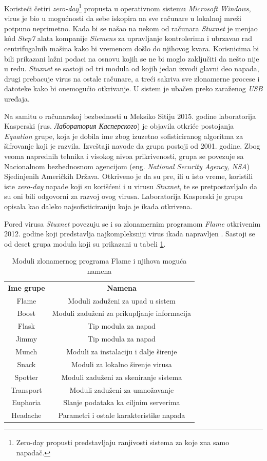 \documentclass[a4paper]{article}
\begin{document}
Koristeći četiri \textit{zero-day}\footnote{Zero-day propusti predstavljaju ranjivosti sistema za koje zna samo napadač.} propusta u operativnom sistemu \textit{Microsoft Windows}, virus je bio u mogućnosti da sebe iskopira na sve računare u lokalnoj mreži potpuno neprimetno. Kada bi se našao na nekom od računara \textit{Stuxnet} je menjao kôd \textit{Step7} alata kompanije \textit{Siemens} za upravljanje kontrolerima i ubrzavao rad centrifugalnih mašina kako bi vremenom došlo do njihovog kvara. Korisnicima bi bili prikazani lažni podaci na osnovu kojih se ne bi moglo zaključiti da nešto nije u redu. \textit{Stuxnet} se sastoji od tri modula od kojih jedan izvodi glavni deo napada, drugi prebacuje virus na ostale računare, a treći sakriva sve zlonamerne procese i datoteke kako bi onemogućio otkrivanje. U sistem je ubačen preko zaraženog \textit{USB} uređaja.

Na samitu o računarskoj bezbednosti u Meksiko Sitiju 2015. godine laboratorija Kasperski (rus. \textit{Лаборатория Касперского}) je objavila otkriće postojanja \textit{Equation} grupe, koja je dobila ime zbog izuzetno sofisticiranog algoritma za šifrovanje koji je razvila. Izveštaji navode da grupa postoji od 2001. godine. Zbog veoma naprednih tehnika i visokog nivoa prikrivenosti, grupa se povezuje sa Nacionalnom bezbednosnom agencijom (eng. \textit{National Security Agency, NSA}) Sjedinjenih Američkih Država. Otkriveno je da su pre, ili u isto vreme, koristili iste \textit{zero-day} napade koji su korišćeni i u virusu \textit{Stuxnet}, te se pretpostavljalo da su oni bili odgovorni za razvoj ovog virusa. Laboratorija Kasperski je grupu opisala kao daleko najsofisticiraniju koja je ikada otkrivena.

Pored virusa \textit{Stuxnet} povezuju se i sa zlonamernim programom \textit{Flame} otkrivenim 2012. godine koji predstavlja najkompleksniji virus ikada napravljen \cite{flame}. Sastoji se od deset grupa modula koji su prikazani u tabeli \ref{table:1}.

\begin{table}[h!]
\centering
\begin{tabular}{||c  c||} 
 \hline
 \textbf{Ime grupe} & \textbf{Namena} \\ 
 Flame & Moduli zaduženi za upad u sistem \\ 
 Boost & Moduli zaduženi za prikupljanje informacija \\
 Flask & Tip modula za napad \\
 Jimmy & Tip modula za napad \\
 Munch & Moduli za instalaciju i dalje širenje \\
 Snack & Moduli za lokalno širenje virusa \\
 Spotter & Moduli zaduženi za skeniranje sistema \\
 Transport & Moduli zaduženi za umnožavanje \\
 Euphoria & Slanje podataka ka ciljnim serverima \\
 Headache & Parametri i ostale karakteristike napada \\ [1ex] 
 \hline
\end{tabular}
\caption{Moduli zlonamernog programa Flame i njihova moguća namena}
\label{table:1}
\end{table}
\end{document}

